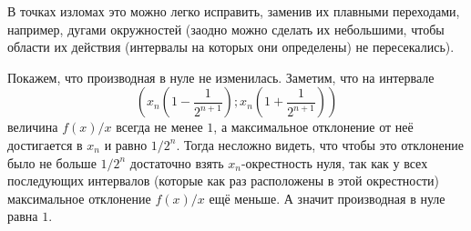 \documentclass[12pt,a4paper]{article}
\begin{document}
\begin{enumproblem}
        В точках изломах это можно легко исправить, заменив их плавными переходами, например, дугами окружностей (заодно можно сделать их небольшими, чтобы области их действия (интервалы на которых они определены) не пересекались).

        Покажем, что производная в нуле не изменилась. Заметим, что на интервале
        \[(x_n(1-\frac{1}{2^{n+1}}); x_n(1+\frac{1}{2^{n+1}}))\]
        величина $f(x) / x$ всегда не менее $1$, а максимальное отклонение от неё достигается в $x_n$ и равно $1/2^n$. Тогда несложно видеть, что чтобы это отклонение было не больше $1/2^n$ достаточно взять $x_n$-окрестность нуля, так как у всех последующих интервалов (которые как раз расположены в этой окрестности) максимальное отклонение $f(x)/x$ ещё меньше. А значит производная в нуле равна $1$.
    \end{enumproblem}
\end{document}
